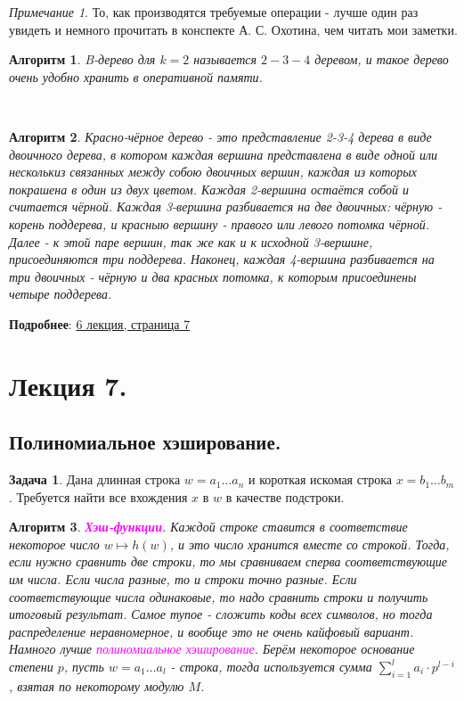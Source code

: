 \documentclass[a4paper]{article}
\theoremstyle{indented}
\newtheorem{alg}{Алгоритм}
\theoremstyle{definition}
\newtheorem{prob}{Задача}
\theoremstyle{remark}
\newtheorem{remark}{Примечание}
\begin{document}
\begin{remark}
    То, как производятся требуемые операции - лучше один раз увидеть и немного прочитать в конспекте А. С. Охотина, чем читать мои заметки.
\end{remark}

\begin{alg}
    B-дерево для $k=2$ называется $2-3-4$ деревом, и такое дерево очень удобно хранить в оперативной памяти. 
\end{alg} \ 

\begin{alg}
    Красно-чёрное дерево - это представление 2-3-4 дерева в виде двоичного дерева, в котором каждая вершина представлена в виде одной или несколькиз связанных между собою двоичных вершин, каждая из которых покрашена в один из двух цветом. Каждая 2-вершина остаётся собой и считается чёрной. Каждая 3-вершина разбивается на две двоичных: чёрную - корень поддерева, и красныю вершину - правого или левого потомка чёрной. Далее - к этой паре вершин, так же как и к исходной 3-вершине, присоединяются три поддерева. Наконец, каждая 4-вершина разбивается на три двоичных - чёрную и два красных потомка, к которым присоединены четыре поддерева.
\end{alg}

\textbf{Подробнее}: \href{https://users.math-cs.spbu.ru/~okhotin/teaching/algorithms_2020/okhotin_algorithms_2020_l6.pdf}{6 лекция, страница 7}

\section{Лекция 7.}

\subsection{Полиномиальное хэширование.}

\begin{prob}
    Дана длинная строка $w=a_1\ldots a_n$ и короткая искомая строка $x=b_1\ldots b_m$. Требуется найти все вхождения $x$ в $w$ в качестве подстроки.
\end{prob}

\begin{alg}
    \textcolor{magenta}{\hypertarget{t30}{\textbf{Хэш-функции}}}. Каждой строке ставится в соответствие некоторое число $w\mapsto h(w)$, и это число хранится вместе со строкой. Тогда, если нужно сравнить две строки, то мы сравниваем сперва соответствующие им числа. Если числа разные, то и строки точно разные. Если соответствующие числа одинаковые, то надо сравнить строки и получить итоговый результат. Самое тупое - сложить коды всех символов, но тогда распределение неравномерное, и вообще это не очень кайфовый вариант. Намного лучше \textcolor{magenta}{\hypertarget{d17}{\textit{полиномиальное хэширование}}}. Берём некоторое основание степени $p$, пусть $w=a_1\ldots a_l$ - строка, тогда используется сумма $\sum_{i=1}^l a_i\cdot p^{l-i}$, взятая по некоторому модулю $M$.
\end{alg} \
\end{document}
